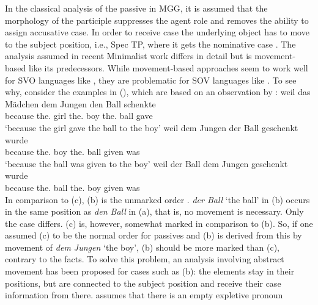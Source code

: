 \documentclass[output=paper,biblatex,babelshorthands,newtxmath,draftmode,colorlinks,citecolor=brown]{langscibook}
\begin{document}

In the classical analysis of the passive in MGG, it is assumed that the morphology of the participle suppresses
the agent role and removes the ability to assign accusative case. In order to receive case the
underlying object has to move to the subject position, i.e., Spec TP, where it gets the nominative case \citep[]{Chomsky81a}.
\eal
{}
\zl
The analysis assumed in recent Minimalist work differs in detail but is movement-based like its
predecessors. While movement-based approaches seem to work well for SVO languages like , they
are problematic for SOV languages like . To see why, consider the examples in
(), which are based on an observation by \citet[Section~4.4.3]{Lenerz77}:
\eal
\label{ex-passive-German-no-movement}
\ex 
\gll weil das Mädchen dem Jungen den Ball schenkte\\
     because the.\nom{} girl the.\dat{} boy the.\acc{} ball gave\\
\glt `because the girl gave the ball to the boy'
\ex 
\gll weil dem Jungen der Ball geschenkt wurde\\
	 because the.\dat{} boy the.\nom{} ball given was\\
\glt `because the ball was given to the boy'
\ex 
\gll weil der Ball dem Jungen geschenkt wurde\\
     because the.\nom{} ball the.\dat{} boy given was\\
\zl
\largerpage[1]
In comparison to (c), (b) is the unmarked order \citep{Hoehle82a}. \emph{der Ball} `the ball' in (b) occurs
in the same position as \emph{den Ball} in (a), that is, no movement is necessary. Only the case differs.
(c) is, however, somewhat marked in comparison to (b). So, if one assumed (c) to
be the normal order for passives and (b) is derived from this by movement of \emph{dem
  Jungen} `the boy', (b) should be more marked than (c), contrary to the facts. To
solve this problem, an analysis involving abstract movement has been proposed for
cases such as (b): the elements stay in their positions, but are connected to
the subject position and receive their case information from there. \citet[]{Grewendorf93}
assumes that there is an empty expletive pronoun
\end{document}
